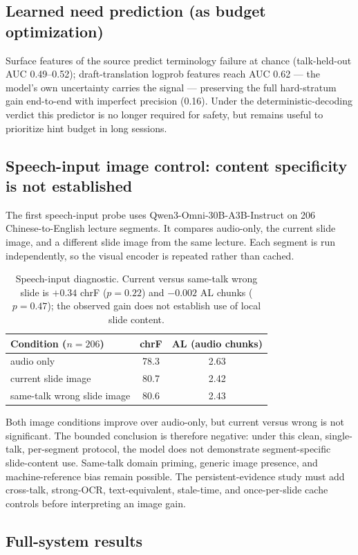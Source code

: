 \subsection{Learned need prediction (as budget optimization)}
Surface features of the source predict terminology failure at chance
(talk-held-out AUC 0.49--0.52); draft-translation logprob features reach AUC
0.62 --- the model's own uncertainty carries the signal --- preserving the full
hard-stratum gain end-to-end with imperfect precision (0.16). Under the
deterministic-decoding verdict this predictor is no longer required for
safety, but remains useful to prioritize hint budget in long sessions.

\subsection{Speech-input image control: content specificity is not established}

The first speech-input probe uses Qwen3-Omni-30B-A3B-Instruct on 206
Chinese-to-English lecture segments. It compares audio-only, the current slide
image, and a different slide image from the same lecture. Each segment is run
independently, so the visual encoder is repeated rather than cached.

\begin{table}[t]
\centering
\small
\begin{tabular}{lcc}
\toprule
Condition ($n{=}206$) & chrF & AL (audio chunks) \\
\midrule
audio only & 78.3 & 2.63 \\
current slide image & 80.7 & 2.42 \\
same-talk wrong slide image & 80.6 & 2.43 \\
\bottomrule
\end{tabular}
\caption{Speech-input diagnostic. Current versus same-talk wrong slide is
$+0.34$ chrF ($p{=}0.22$) and $-0.002$ AL chunks ($p{=}0.47$); the observed
gain does not establish use of local slide content.}
\label{tab:speech-image-control}
\end{table}

Both image conditions improve over audio-only, but current versus wrong is not
significant. The bounded conclusion is therefore negative: under this clean,
single-talk, per-segment protocol, the model does not demonstrate
segment-specific slide-content use. Same-talk domain priming, generic image
presence, and machine-reference bias remain possible. The persistent-evidence
study must add cross-talk, strong-OCR, text-equivalent, stale-time, and
once-per-slide cache controls before interpreting an image gain.

\subsection{Full-system results}
